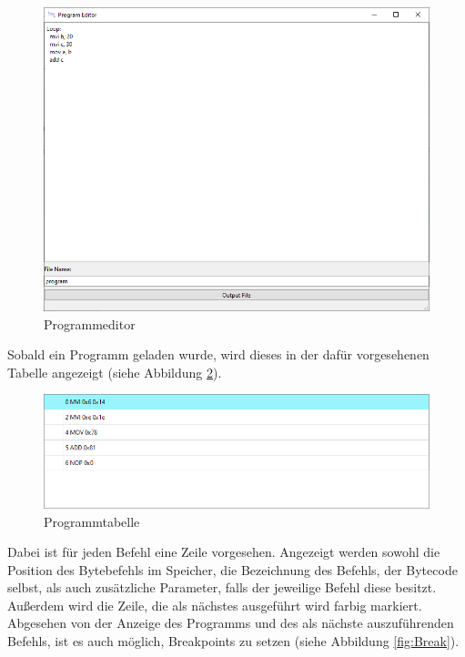 \documentclass[12pt]{article}
\newcommand{\imgSpaceBefore}{\vspace{10pt}}
\begin{document}
\begin{figure}[H]
\centering
\includegraphics[width=15cm]{bilder/ProgramEditor}
\caption{Programmeditor}
\label{fig:ProgEdit}
\end{figure}

\noindent
Sobald ein Programm geladen wurde, wird dieses in der dafür vorgesehenen Tabelle angezeigt (siehe Abbildung \ref{fig:ProgTable}).\imgSpaceBefore

\begin{figure}[H]
\centering
\includegraphics[width=15cm]{bilder/Program_table}
\caption{Programmtabelle}
\label{fig:ProgTable}
\end{figure}

\noindent
Dabei ist für jeden Befehl eine Zeile vorgesehen. Angezeigt werden sowohl die Position des Bytebefehls im Speicher, die Bezeichnung des Befehls, der Bytecode selbst, als auch zusätzliche Parameter, falls der jeweilige Befehl diese besitzt. Außerdem wird die Zeile, die als nächstes ausgeführt wird farbig markiert. Abgesehen von der Anzeige des Programms und des als nächste auszuführenden Befehls, ist es auch möglich, Breakpoints zu setzen (siehe Abbildung \ref{fig:Break}).\imgSpaceBefore
\end{document}
